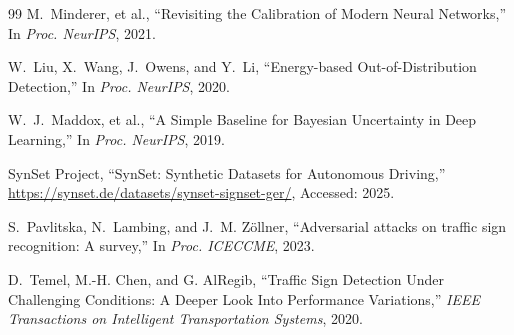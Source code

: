 \documentclass[11pt,a4paper]{article}
\begin{document}
\begin{thebibliography}{99}
M.~Minderer, et al.,
\newblock ``Revisiting the Calibration of Modern Neural Networks,''
\newblock In \emph{Proc. NeurIPS}, 2021.

W.~Liu, X.~Wang, J.~Owens, and Y.~Li,
\newblock ``Energy-based Out-of-Distribution Detection,''
\newblock In \emph{Proc. NeurIPS}, 2020.

W.~J.~Maddox, et al.,
\newblock ``A Simple Baseline for Bayesian Uncertainty in Deep Learning,''
\newblock In \emph{Proc. NeurIPS}, 2019.

SynSet Project,
\newblock ``SynSet: Synthetic Datasets for Autonomous Driving,''
\newblock \url{https://synset.de/datasets/synset-signset-ger/}, Accessed: 2025.

S.~Pavlitska, N.~Lambing, and J.~M. Zöllner,
\newblock ``Adversarial attacks on traffic sign recognition: A survey,''
\newblock In \emph{Proc. ICECCME}, 2023.

D.~Temel, M.-H. Chen, and G. AlRegib,
\newblock ``Traffic Sign Detection Under Challenging Conditions: A Deeper Look Into Performance Variations,''
\newblock \emph{IEEE Transactions on Intelligent Transportation Systems}, 2020.

\end{thebibliography}
\end{document}
